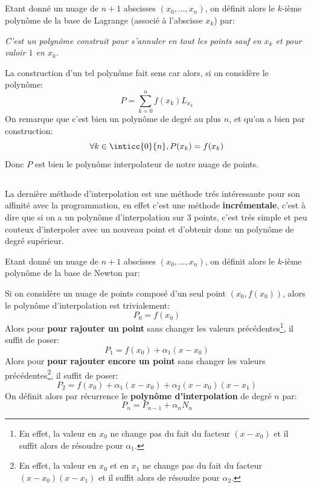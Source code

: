 \subsection*{}
Etant donné un nuage de \(n + 1\) abscisses \((x_0, \ldots, x_n)\), on définit alors le \(k\)-ième polynôme de la base de Lagrange (associé à l'abscisse \(x_k\)) par:
\begin{center}
   \textit{C'est un polynôme construit pour s'annuler en tout les points sauf en \(x_k\) et pour valoir \(1\) en \(x_k\).}
\end{center}
La construction d'un tel polynôme fait sens car alors, si on considère le polynôme:
\[
   P = \sum_{k=0}^{n}f(x_k)L_{x_k}
\]
On remarque que c'est bien un polynôme de degré au plus \(n\), et qu'on a bien par construction: 
\[
   \forall k \in \inticc{0}{n} , P(x_k) = f(x_k)
\] 
Donc \(P\) est bien le polynôme interpolateur de notre nuage de points.

\subsection*{}
La dernière méthode d'interpolation est une méthode trés intéressante pour son affinité avec la programmation, en effet c'est une méthode \textbf{incrémentale}, c'est à dire que si on a un polynôme d'interpolation sur \(3\) points, c'est trés simple et peu couteux d'interpoler avec un nouveau point et d'obtenir donc un polynôme de degré supérieur.\<

Etant donné un nuage de \(n + 1\) abscisses \((x_0, \ldots, x_n)\), on définit alors le \(k\)-ième polynôme de la base de Newton par:

Si on considère un nuage de points composé d'un seul point \((x_0, f(x_0))\), alors le polynôme d'interpolation est trivialement:
\[
   P_0 = f(x_0)
\]
Alors pour \textbf{pour rajouter un point} sans changer les valeurs précédentes\footnote[1]{En effet, la valeur en \(x_0\) ne change pas du fait du facteur \((x-x_0)\) et il suffit alors de résoudre pour \(\alpha_1\).
}, il suffit de poser:
\[
   P_1 = f(x_0) + \alpha_1(x - x_0)
\]
Alors pour \textbf{pour rajouter encore un point} sans changer les valeurs précédentes\footnote[2]{En effet, la valeur en \(x_0\) et en \(x_1\) ne change pas du fait du facteur \((x-x_0)(x-x_1)\) et il suffit alors de résoudre pour \(\alpha_2\).}, il suffit de poser:
\[
   P_2 = f(x_0) + \alpha_1(x - x_0) + \alpha_2(x-x_0)(x-x_1)
\]
On définit alors par récurrence le \textbf{polynôme d'interpolation} de degré \(n\) par:
\[
   P_n = P_{n-1} + \alpha_{n}N_n
\]

